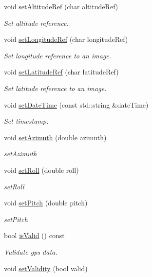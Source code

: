 \begin{DoxyCompactItemize}
void \hyperlink{classwtl_1_1_g_p_s_info_a00e0e590f8284ab13125f093e7ad37bd}{set\+Altitude\+Ref} (char altitude\+Ref)
\begin{DoxyCompactList}\small\item\em Set altitude reference. \end{DoxyCompactList}\item 
void \hyperlink{classwtl_1_1_g_p_s_info_a011d00aa6a11ac3cf963197ea69e2e79}{set\+Longitude\+Ref} (char longitude\+Ref)
\begin{DoxyCompactList}\small\item\em Set longitude reference to an image. \end{DoxyCompactList}\item 
void \hyperlink{classwtl_1_1_g_p_s_info_aef74bb3944920343030625b8265bda91}{set\+Latitude\+Ref} (char latitude\+Ref)
\begin{DoxyCompactList}\small\item\em Set latitude reference to an image. \end{DoxyCompactList}\item 
void \hyperlink{classwtl_1_1_g_p_s_info_a91868a182c714d736e6ab1b480d64d00}{set\+Date\+Time} (const std\+::string \&date\+Time)
\begin{DoxyCompactList}\small\item\em Set timestamp. \end{DoxyCompactList}\item 
void \hyperlink{classwtl_1_1_g_p_s_info_a20f8cec0456c226892b947d348a92ebb}{set\+Azimuth} (double azimuth)
\begin{DoxyCompactList}\small\item\em set\+Azimuth \end{DoxyCompactList}\item 
void \hyperlink{classwtl_1_1_g_p_s_info_a2930689283ef6f7e4aba0da7d5795c9f}{set\+Roll} (double roll)
\begin{DoxyCompactList}\small\item\em set\+Roll \end{DoxyCompactList}\item 
void \hyperlink{classwtl_1_1_g_p_s_info_a7b0f3aff5f48c699d33dfc96fbffa14c}{set\+Pitch} (double pitch)
\begin{DoxyCompactList}\small\item\em set\+Pitch \end{DoxyCompactList}\item 
bool \hyperlink{classwtl_1_1_g_p_s_info_a4b05f34ce82445d516bf688ef817f04c}{is\+Valid} () const
\begin{DoxyCompactList}\small\item\em Validate gps data. \end{DoxyCompactList}\item 
void \hyperlink{classwtl_1_1_g_p_s_info_a161bc31bddc2b42889e526d9a729d7d7}{set\+Validity} (bool valid)
\end{DoxyCompactItemize}


